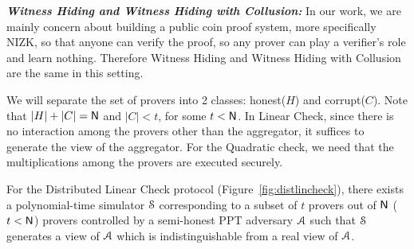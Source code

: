\noindent\textit{\textbf{Witness Hiding and Witness Hiding with Collusion:}} In our work, we are mainly concern about building a public coin proof system, more specifically NIZK, so that anyone can verify the proof, so any prover can play a verifier's role and learn nothing. Therefore Witness Hiding and Witness Hiding with Collusion are the same in this setting. 

We will separate the set of provers into 2 classes: honest($H$) and corrupt($C$). Note that $|H|+|C|=\mathsf{N}$ and $|C|<t$, for some $t<\mathsf{N}$. In Linear Check, since there is no interaction among the provers other than the aggregator, it suffices to generate the view of the aggregator. For the Quadratic check, we need that the multiplications among the provers are executed securely. 
\begin{lemma}\label{lem:WHlin}
	For the Distributed Linear Check protocol (Figure~\ref{fig:distlincheck}), there exists a polynomial-time simulator $\mathcal{S}$ corresponding to a subset of $t$ provers out of $\mathsf{N}$ ($t < \mathsf{N}$) provers controlled by a semi-honest PPT adversary $\mathcal{A}$ such that $\mathcal{S}$ generates a view of $\mathcal{A}$ which is indistinguishable from a real view of $\mathcal{A}$.
\end{lemma}
